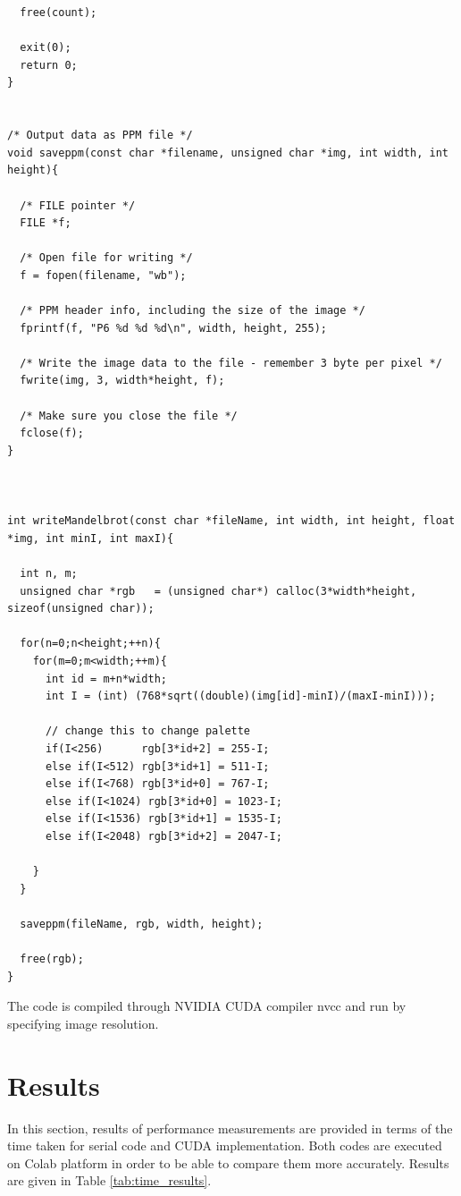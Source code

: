 \documentclass{article}
\begin{document}
\begin{verbatim}
  free(count);

  exit(0);
  return 0;
}


/* Output data as PPM file */
void saveppm(const char *filename, unsigned char *img, int width, int height){

  /* FILE pointer */
  FILE *f;

  /* Open file for writing */
  f = fopen(filename, "wb");

  /* PPM header info, including the size of the image */
  fprintf(f, "P6 %d %d %d\n", width, height, 255);

  /* Write the image data to the file - remember 3 byte per pixel */
  fwrite(img, 3, width*height, f);

  /* Make sure you close the file */
  fclose(f);
}



int writeMandelbrot(const char *fileName, int width, int height, float *img, int minI, int maxI){

  int n, m;
  unsigned char *rgb   = (unsigned char*) calloc(3*width*height, sizeof(unsigned char));

  for(n=0;n<height;++n){
    for(m=0;m<width;++m){
      int id = m+n*width;
      int I = (int) (768*sqrt((double)(img[id]-minI)/(maxI-minI)));

      // change this to change palette
      if(I<256)      rgb[3*id+2] = 255-I;
      else if(I<512) rgb[3*id+1] = 511-I;
      else if(I<768) rgb[3*id+0] = 767-I;
      else if(I<1024) rgb[3*id+0] = 1023-I;
      else if(I<1536) rgb[3*id+1] = 1535-I;
      else if(I<2048) rgb[3*id+2] = 2047-I;

    }
  }

  saveppm(fileName, rgb, width, height);

  free(rgb);
}
\end{verbatim}
The code is compiled through NVIDIA CUDA compiler nvcc and run by specifying image resolution. 
\clearpage 
\section{Results}
In this section, results of performance measurements are provided in terms of the time taken for serial code and CUDA implementation. Both codes are executed on Colab platform in order to be able to compare them more accurately. Results are given in Table \ref{tab:time_results}. 
\end{document}
